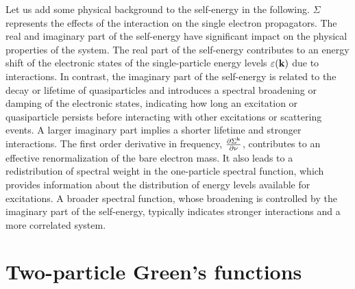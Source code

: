 \documentclass[../../main.tex]{subfiles}
\begin{document}
Let us add some physical background to the self-energy in the following. $\Sigma$ represents the effects of the interaction on the single electron propagators. The real and imaginary part of the self-energy have significant impact on the physical properties of the system. The real part of the self-energy contributes to an energy shift of the electronic states of the single-particle energy levels $\varepsilon(\textbf{k})$ due to interactions. In contrast, the imaginary part of the self-energy is related to the decay or lifetime of quasiparticles and introduces a spectral broadening or damping of the electronic states, indicating how long an excitation or quasiparticle persists before interacting with other excitations or scattering events. A larger imaginary part implies a shorter lifetime and stronger interactions. The first order derivative in frequency, $\frac{\partial \Sigma^{\text{k}}}{\partial \nu}$, contributes to an effective renormalization of the bare electron mass. It also leads to a redistribution of spectral weight in the one-particle spectral function, which provides information about the distribution of energy levels available for excitations. A broader spectral function, whose broadening is controlled by the imaginary part of the self-energy, typically indicates stronger interactions and a more correlated system.

\section{Two-particle Green's functions}
\end{document}
